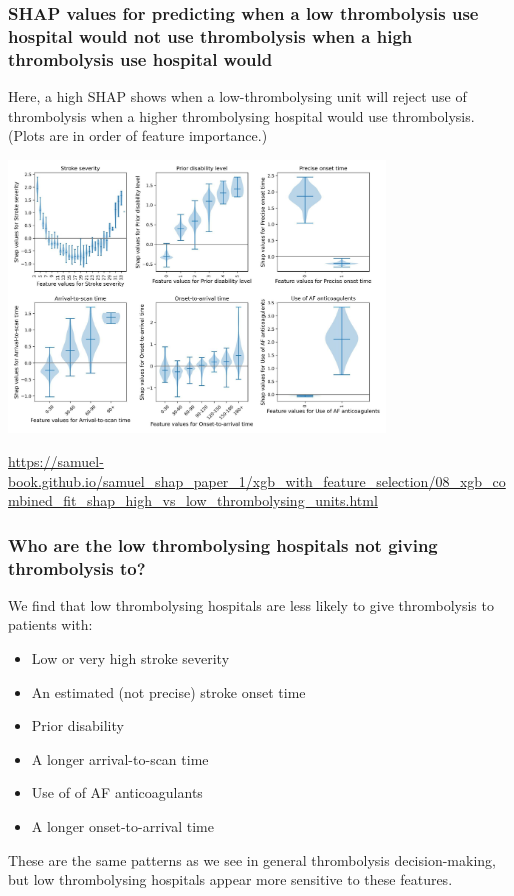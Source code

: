 \documentclass[xcolor={usenames,dvipsnames}]{beamer}
\newcommand{\smallurl}[1]{\textcolor{blue}{\fontsize{4pt}{4.8pt}\selectfont \url{#1}}}
\begin{document}
\begin{frame}
\frametitle{SHAP values for predicting when a low thrombolysis use hospital would \textbf{not} use thrombolysis when a high thrombolysis use hospital would}


\tiny{Here, a high SHAP shows when a low-thrombolysing unit will reject use of thrombolysis when a higher thrombolysing hospital would use thrombolysis. (Plots are in order of feature importance.)}

\vspace{-0.5em}
\begin{center} 
\includegraphics[width=0.75\textwidth, trim=0 0 0 2.5em, clip]{./images/shap_not_use_thrombolysis}
\end{center} 

\vspace{-1.3em}
\smallurl{https://samuel-book.github.io/samuel_shap_paper_1/xgb_with_feature_selection/08_xgb_combined_fit_shap_high_vs_low_thrombolysing_units.html}

\end{frame}


\begin{frame}
\frametitle{Who are the low thrombolysing hospitals not giving thrombolysis to?}

We find that low thrombolysing hospitals are less likely to give thrombolysis to patients with:

\begin{itemize}
  \item Low or very high stroke severity
  \item An estimated (not precise) stroke onset time
  \item Prior disability
  \item A longer arrival-to-scan time
  \item Use of of AF anticoagulants
  \item A longer onset-to-arrival time
\end{itemize}

\vspace{2em}

These are the same patterns as we see in general thrombolysis decision-making,
but low thrombolysing hospitals appear more sensitive to these features.

\end{frame}
\end{document}
